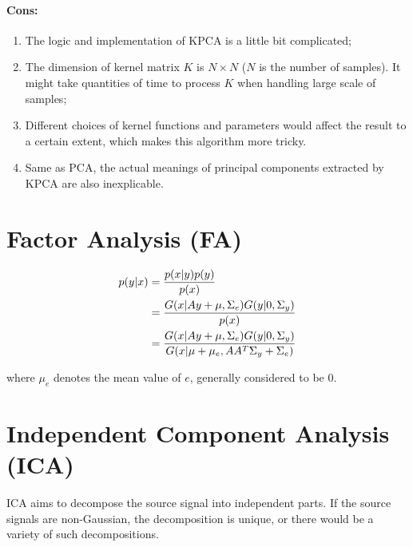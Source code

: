 \documentclass[12pt,a4paper]{article}
\theoremstyle{definition}
\begin{document}
\vspace{-0.03\linewidth}
\paragraph{Cons:}
\begin{enumerate}
	\item The logic and implementation of KPCA is a little bit complicated;
	
	\item The dimension of kernel matrix $K$ is $N \times N$ ($N$ is the number of samples). It might take quantities of time to process $K$ when handling large scale of samples;
	
	\item Different choices of kernel functions and parameters would affect the result to a certain extent, which makes this algorithm more tricky.
	
	\item Same as PCA, the actual meanings of principal components extracted by KPCA are also inexplicable.
\end{enumerate}

\section{Factor Analysis (FA)}

\vspace{-0.03\linewidth}
\begin{large}
\begin{align*}
	\centering	
	p(y|x) &= \dfrac{p(x|y)p(y)}{p(x)} \\
	&= \dfrac{G(x|Ay+\mu,\Sigma_{e})G(y|0,\Sigma_{y})}{p(x)} \\
	&= \dfrac{G(x|Ay+\mu,\Sigma_{e})G(y|0,\Sigma_{y})}{G(x|\mu+\mu_{e},AA^{T}\Sigma_{y}+\Sigma_{e})}
\end{align*}
\end{large}

where $\mu_{e}$ denotes the mean value of $e$, generally considered to be 0.

\section{Independent Component Analysis (ICA)}

ICA aims to decompose the source signal into independent parts. If the source signals are non-Gaussian, the decomposition is unique, or there would be a variety of such decompositions.
\end{document}
